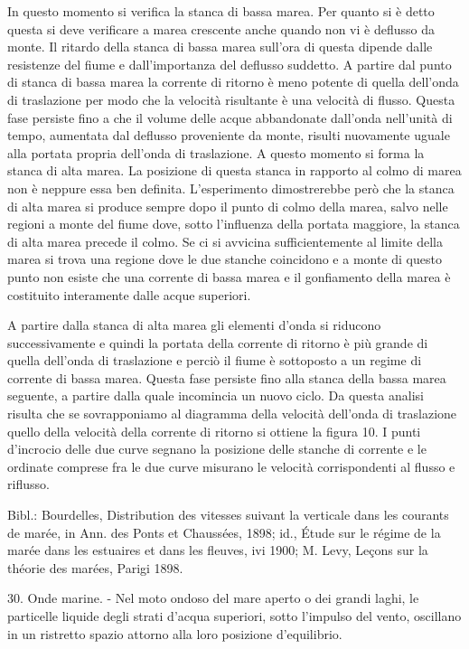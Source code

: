 \documentclass[a4paper]{article}
\begin{document}
In questo momento si verifica la stanca di bassa marea. Per quanto si è detto questa si deve verificare a marea crescente anche quando non vi è deflusso da monte. Il ritardo della stanca di bassa marea sull'ora di questa dipende dalle resistenze del fiume e dall'importanza del deflusso suddetto. A partire dal punto di stanca di bassa marea la corrente di ritorno è meno potente di quella dell'onda di traslazione per modo che la velocità risultante è una velocità di flusso. Questa fase persiste fino a che il volume delle acque abbandonate dall'onda nell'unità di tempo, aumentata dal deflusso proveniente da monte, risulti nuovamente uguale alla portata propria dell'onda di traslazione. A questo momento si forma la stanca di alta marea. La posizione di questa stanca in rapporto al colmo di marea non è neppure essa ben definita. L'esperimento dimostrerebbe però che la stanca di alta marea si produce sempre dopo il punto di colmo della marea, salvo nelle regioni a monte del fiume dove, sotto l'influenza della portata maggiore, la stanca di alta marea precede il colmo. Se ci si avvicina sufficientemente al limite della marea si trova una regione dove le due stanche coincidono e a monte di questo punto non esiste che una corrente di bassa marea e il gonfiamento della marea è costituito interamente dalle acque superiori.

A partire dalla stanca di alta marea gli elementi d'onda si riducono successivamente e quindi la portata della corrente di ritorno è più grande di quella dell'onda di traslazione e perciò il fiume è sottoposto a un regime di corrente di bassa marea. Questa fase persiste fino alla stanca della bassa marea seguente, a partire dalla quale incomincia un nuovo ciclo. Da questa analisi risulta che se sovrapponiamo al diagramma della velocità dell'onda di traslazione quello della velocità della corrente di ritorno si ottiene la figura 10. I punti d'incrocio delle due curve segnano la posizione delle stanche di corrente e le ordinate comprese fra le due curve misurano le velocità corrispondenti al flusso e riflusso.

Bibl.: Bourdelles, Distribution des vitesses suivant la verticale dans les courants de marée, in Ann. des Ponts et Chaussées, 1898; id., Étude sur le régime de la marée dans les estuaires et dans les fleuves, ivi 1900; M. Levy, Leçons sur la théorie des marées, Parigi 1898.

30. Onde marine. - Nel moto ondoso del mare aperto o dei grandi laghi, le particelle liquide degli strati d'acqua superiori, sotto l'impulso del vento, oscillano in un ristretto spazio attorno alla loro posizione d'equilibrio.
\end{document}
